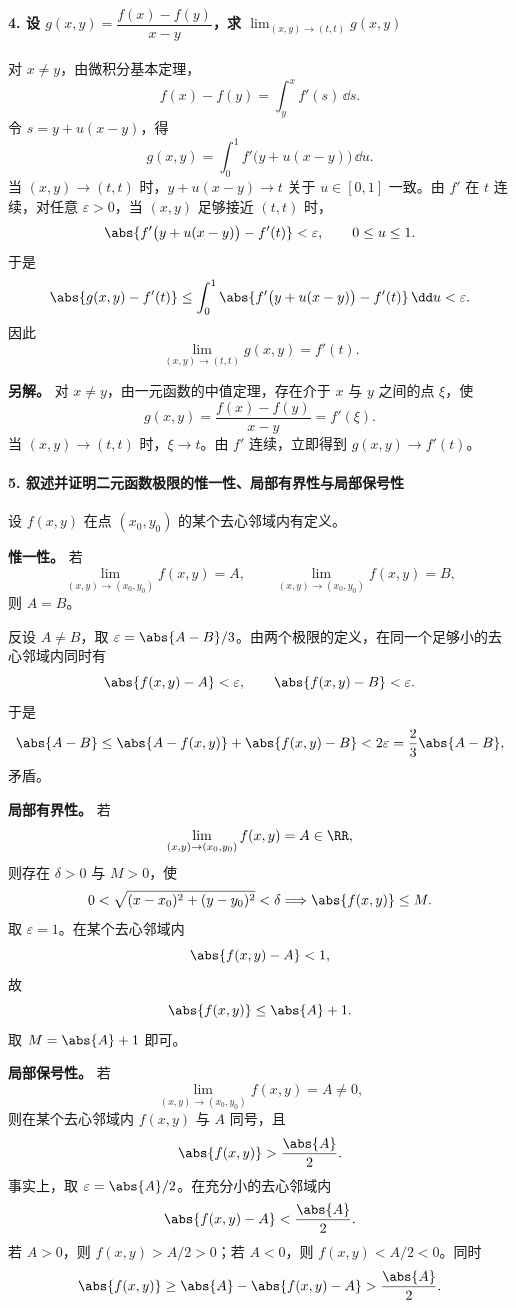\paragraph{4. 设 $g(x,y)=\dfrac{f(x)-f(y)}{x-y}$，求 $\displaystyle\lim_{(x,y)\to(t,t)}g(x,y)$}
\begin{xsolution}
对 $x\ne y$，由微积分基本定理，
\[
  f(x)-f(y)=\int_y^x f'(s)\,\dd s.
\]
令 $s=y+u(x-y)$，得
\[
  g(x,y)
  =\int_0^1f'\bigl(y+u(x-y)\bigr)\,\dd u.
\]
当 $(x,y)\to(t,t)$ 时，$y+u(x-y)\to t$ 关于 $u\in[0,1]$ 一致。由 $f'$ 在 $t$ 连续，对任意 $\varepsilon>0$，当 $(x,y)$ 足够接近 $(t,t)$ 时，
\[
  \abs{f'\bigl(y+u(x-y)\bigr)-f'(t)}<\varepsilon,
  \qquad0\le u\le1.
\]
于是
\[
  \abs{g(x,y)-f'(t)}
  \le
  \int_0^1\abs{f'\bigl(y+u(x-y)\bigr)-f'(t)}\,\dd u
  <\varepsilon.
\]
因此
\[
  \boxed{\displaystyle
  \lim_{(x,y)\to(t,t)}g(x,y)=f'(t)}.
\]

\textbf{另解。} 对 $x\ne y$，由一元函数的中值定理，存在介于 $x$ 与 $y$ 之间的点 $\xi$，使
\[
  g(x,y)=\frac{f(x)-f(y)}{x-y}=f'(\xi).
\]
当 $(x,y)\to(t,t)$ 时，$\xi\to t$。由 $f'$ 连续，立即得到 $g(x,y)\to f'(t)$。
\end{xsolution}

\paragraph{5. 叙述并证明二元函数极限的惟一性、局部有界性与局部保号性}
\begin{xsolution}
设 $f(x,y)$ 在点 $(x_0,y_0)$ 的某个去心邻域内有定义。

\textbf{惟一性。} 若
\[
  \lim_{(x,y)\to(x_0,y_0)}f(x,y)=A,
  \qquad
  \lim_{(x,y)\to(x_0,y_0)}f(x,y)=B,
\]
则 $A=B$。

反设 $A\ne B$，取 $\varepsilon=\abs{A-B}/3$。由两个极限的定义，在同一个足够小的去心邻域内同时有
\[
  \abs{f(x,y)-A}<\varepsilon,
  \qquad
  \abs{f(x,y)-B}<\varepsilon.
\]
于是
\[
  \abs{A-B}
  \le\abs{A-f(x,y)}+\abs{f(x,y)-B}
  <2\varepsilon
  =\frac23\abs{A-B},
\]
矛盾。

\textbf{局部有界性。} 若
\[
  \lim_{(x,y)\to(x_0,y_0)}f(x,y)=A\in\RR,
\]
则存在 $\delta>0$ 与 $M>0$，使
\[
  0<\sqrt{(x-x_0)^2+(y-y_0)^2}<\delta
  \Longrightarrow
  \abs{f(x,y)}\le M.
\]
取 $\varepsilon=1$。在某个去心邻域内
\[
  \abs{f(x,y)-A}<1,
\]
故
\[
  \abs{f(x,y)}\le\abs{A}+1.
\]
取 $M=\abs{A}+1$ 即可。

\textbf{局部保号性。} 若
\[
  \lim_{(x,y)\to(x_0,y_0)}f(x,y)=A\ne0,
\]
则在某个去心邻域内 $f(x,y)$ 与 $A$ 同号，且
\[
  \abs{f(x,y)}>\frac{\abs{A}}{2}.
\]
事实上，取 $\varepsilon=\abs{A}/2$。在充分小的去心邻域内
\[
  \abs{f(x,y)-A}<\frac{\abs{A}}{2}.
\]
若 $A>0$，则 $f(x,y)>A/2>0$；若 $A<0$，则 $f(x,y)<A/2<0$。同时
\[
  \abs{f(x,y)}
  \ge\abs{A}-\abs{f(x,y)-A}
  >\frac{\abs{A}}{2}.
\]
\end{xsolution}


